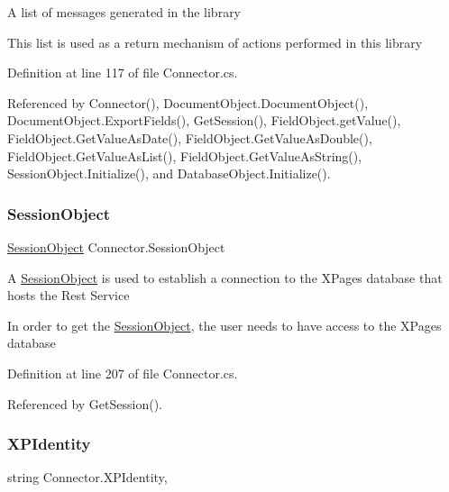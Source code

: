 A list of messages generated in the library 

This list is used as a return mechanism of actions performed in this library

Definition at line 117 of file Connector.\+cs.



Referenced by Connector(), Document\+Object.\+Document\+Object(), Document\+Object.\+Export\+Fields(), Get\+Session(), Field\+Object.\+get\+Value(), Field\+Object.\+Get\+Value\+As\+Date(), Field\+Object.\+Get\+Value\+As\+Double(), Field\+Object.\+Get\+Value\+As\+List(), Field\+Object.\+Get\+Value\+As\+String(), Session\+Object.\+Initialize(), and Database\+Object.\+Initialize().

\mbox{\label{class_connector_a0a7bb42f9530796c086ab50785147ce9}} 
\subsubsection{\texorpdfstring{Session\+Object}{SessionObject}}
{\footnotesize\ttfamily \hyperlink{class_session_object}{Session\+Object} Connector.\+Session\+Object\hspace{0.3cm}{\ttfamily [get]}}



A \hyperlink{class_session_object}{Session\+Object} is used to establish a connection to the X\+Pages database that hosts the Rest Service 

In order to get the \hyperlink{class_session_object}{Session\+Object}, the user needs to have access to the X\+Pages database

Definition at line 207 of file Connector.\+cs.



Referenced by Get\+Session().

\mbox{\label{class_connector_a092e3e36f92c129c07c57df9b8fb91ca}} 
\subsubsection{\texorpdfstring{X\+P\+Identity}{XPIdentity}}
{\footnotesize\ttfamily string Connector.\+X\+P\+Identity\hspace{0.3cm}{\ttfamily [get]}, {\ttfamily [set]}}




